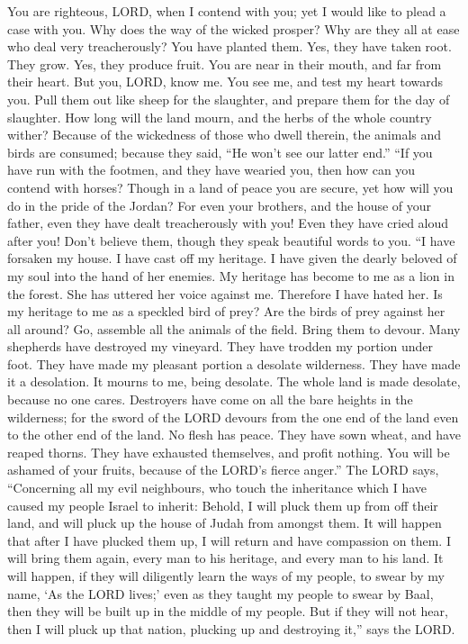  You are righteous, LORD, when I contend with you; yet I
would like to plead a case with you. Why does the way of the wicked
prosper? Why are they all at ease who deal very treacherously?
 You have planted them. Yes, they have taken root. They
grow. Yes, they produce fruit. You are near in their mouth, and far from
their heart.  But you, LORD, know me. You see me, and test
my heart towards you. Pull them out like sheep for the slaughter, and
prepare them for the day of slaughter.  How long will the
land mourn, and the herbs of the whole country wither? Because of the
wickedness of those who dwell therein, the animals and birds are
consumed; because they said, ``He won't see our latter end.''
 ``If you have run with the footmen, and they have wearied
you, then how can you contend with horses? Though in a land of peace you
are secure, yet how will you do in the pride of the Jordan? 
For even your brothers, and the house of your father, even they have
dealt treacherously with you! Even they have cried aloud after you!
Don't believe them, though they speak beautiful words to you.
 ``I have forsaken my house. I have cast off my heritage. I
have given the dearly beloved of my soul into the hand of her enemies.
 My heritage has become to me as a lion in the forest. She
has uttered her voice against me. Therefore I have hated her.
 Is my heritage to me as a speckled bird of prey? Are the
birds of prey against her all around? Go, assemble all the animals of
the field. Bring them to devour.  Many shepherds have
destroyed my vineyard. They have trodden my portion under foot. They
have made my pleasant portion a desolate wilderness.  They
have made it a desolation. It mourns to me, being desolate. The whole
land is made desolate, because no one cares.  Destroyers
have come on all the bare heights in the wilderness; for the sword of
the LORD devours from the one end of the land even to the other end of
the land. No flesh has peace.  They have sown wheat, and
have reaped thorns. They have exhausted themselves, and profit nothing.
You will be ashamed of your fruits, because of the LORD's fierce
anger.''  The LORD says, ``Concerning all my evil
neighbours, who touch the inheritance which I have caused my people
Israel to inherit: Behold, I will pluck them up from off their land, and
will pluck up the house of Judah from amongst them.  It
will happen that after I have plucked them up, I will return and have
compassion on them. I will bring them again, every man to his heritage,
and every man to his land.  It will happen, if they will
diligently learn the ways of my people, to swear by my name, `As the
LORD lives;' even as they taught my people to swear by Baal, then they
will be built up in the middle of my people.  But if they
will not hear, then I will pluck up that nation, plucking up and
destroying it,'' says the LORD.

